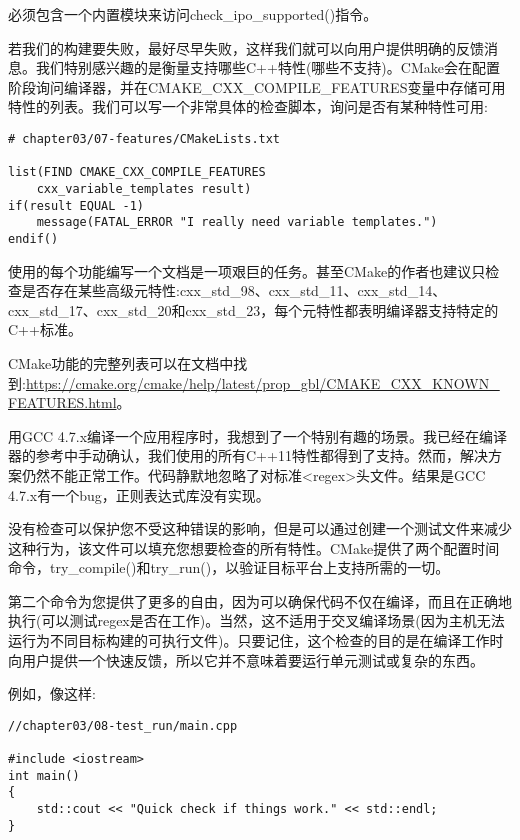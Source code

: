 必须包含一个内置模块来访问check\_ipo\_supported()指令。


若我们的构建要失败，最好尽早失败，这样我们就可以向用户提供明确的反馈消息。我们特别感兴趣的是衡量支持哪些C++特性(哪些不支持)。CMake会在配置阶段询问编译器，并在CMAKE\_CXX\_COMPILE\_FEATURES变量中存储可用特性的列表。我们可以写一个非常具体的检查脚本，询问是否有某种特性可用:

\begin{lstlisting}[style=styleCMake]
# chapter03/07-features/CMakeLists.txt

list(FIND CMAKE_CXX_COMPILE_FEATURES
	cxx_variable_templates result)
if(result EQUAL -1)
	message(FATAL_ERROR "I really need variable templates.")
endif()
\end{lstlisting}

使用的每个功能编写一个文档是一项艰巨的任务。甚至CMake的作者也建议只检查是否存在某些高级元特性:cxx\_std\_98、cxx\_std\_11、cxx\_std\_14、cxx\_std\_17、cxx\_std\_20和cxx\_std\_23，每个元特性都表明编译器支持特定的C++标准。

CMake功能的完整列表可以在文档中找到:\url{https://cmake.org/cmake/help/latest/prop_gbl/CMAKE_CXX_KNOWN_ FEATURES.html}。


用GCC 4.7.x编译一个应用程序时，我想到了一个特别有趣的场景。我已经在编译器的参考中手动确认，我们使用的所有C++11特性都得到了支持。然而，解决方案仍然不能正常工作。代码静默地忽略了对标准<regex>头文件。结果是GCC 4.7.x有一个bug，正则表达式库没有实现。

没有检查可以保护您不受这种错误的影响，但是可以通过创建一个测试文件来减少这种行为，该文件可以填充您想要检查的所有特性。CMake提供了两个配置时间命令，try\_compile()和try\_run()，以验证目标平台上支持所需的一切。

第二个命令为您提供了更多的自由，因为可以确保代码不仅在编译，而且在正确地执行(可以测试regex是否在工作)。当然，这不适用于交叉编译场景(因为主机无法运行为不同目标构建的可执行文件)。只要记住，这个检查的目的是在编译工作时向用户提供一个快速反馈，所以它并不意味着要运行单元测试或复杂的东西。

例如，像这样:

\begin{lstlisting}[style=styleCXX]
//chapter03/08-test_run/main.cpp

#include <iostream>
int main()
{
	std::cout << "Quick check if things work." << std::endl;
}
\end{lstlisting}

